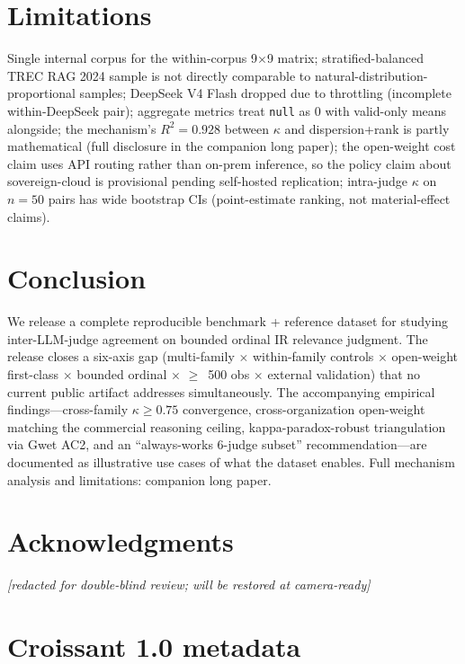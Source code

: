 \documentclass{article}
\begin{document}
\section{Limitations}

Single internal corpus for the within-corpus 9$\times$9 matrix; stratified-balanced TREC RAG 2024 sample is not directly comparable to natural-distribution-proportional samples; DeepSeek V4 Flash dropped due to throttling (incomplete within-DeepSeek pair); aggregate metrics treat \texttt{null} as 0 with valid-only means alongside; the mechanism's $R^2 = 0.928$ between $\kappa$ and dispersion+rank is partly mathematical (full disclosure in the companion long paper); the open-weight cost claim uses API routing rather than on-prem inference, so the policy claim about sovereign-cloud is provisional pending self-hosted replication; intra-judge $\kappa$ on $n = 50$ pairs has wide bootstrap CIs (point-estimate ranking, not material-effect claims).

\section{Conclusion}

We release a complete reproducible benchmark + reference dataset for studying inter-LLM-judge agreement on bounded ordinal IR relevance judgment. The release closes a six-axis gap (multi-family $\times$ within-family controls $\times$ open-weight first-class $\times$ bounded ordinal $\times$ $\geq$~500 obs $\times$ external validation) that no current public artifact addresses simultaneously. The accompanying empirical findings---cross-family $\kappa \geq 0.75$ convergence, cross-organization open-weight matching the commercial reasoning ceiling, kappa-paradox-robust triangulation via Gwet AC2, and an ``always-works 6-judge subset'' recommendation---are documented as illustrative use cases of what the dataset enables. Full mechanism analysis and limitations: companion long paper.

\section*{Acknowledgments}

\textit{[redacted for double-blind review; will be restored at camera-ready]}




\appendix

\section{Croissant 1.0 metadata}\label{app:croissant}
\end{document}
